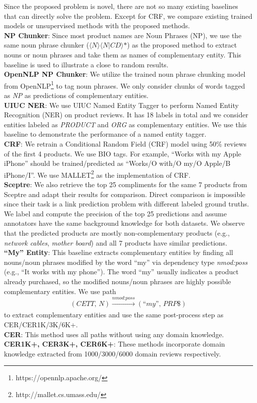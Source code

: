 Since the proposed problem is novel, there are not so many existing baselines that can directly solve the problem. Except for CRF, we compare existing trained models or unsupervised methods with the proposed methods.\\
\textbf{NP Chunker}: Since most product names are Noun Phrases (NP), we use the same noun phrase chunker ($\langle \textit{N} \rangle \langle \textit{N}\vert \textit{CD} \rangle \textit{*}$) as the proposed method to extract nouns or noun phrases and take them as names of complementary entity. This baseline is used to illustrate a close to random results.\\
\textbf{OpenNLP NP Chunker}: We utilize the trained noun phrase chunking model from OpenNLP\footnote{https://opennlp.apache.org/} to tag noun phrases. We only consider chunks of words tagged as \textit{NP} as predictions of complementary entities.\\
\textbf{UIUC NER}: We use UIUC Named Entity Tagger \cite{ratinov2009design} to perform Named Entity Recognition (NER) on product reviews. It has 18 labels in total and we consider entities labeled as \textit{PRODUCT} and \textit{ORG} as complementary entities. We use this baseline to demonstrate the performance of a named entity tagger.\\
\textbf{CRF}: We retrain a Conditional Random Field (CRF) model using 50\% reviews of the first 4 products. We use BIO tags. For example, ``Works with my Apple iPhone'' should be trained/predicted as ``Works/O with/O my/O Apple/B iPhone/I''. We use MALLET\footnote{http://mallet.cs.umass.edu/} as the implementation of CRF.\\
\textbf{Sceptre}: We also retrieve the top 25 compliments for the same 7 products from Sceptre \cite{McAPanLes15} and adapt their results for comparison. Direct comparison is impossible since their task is a link prediction problem with different labeled ground truths. We label and compute the precision of the top 25 predictions and assume annotators have the same background knowledge for both datasets. We observe that the predicted products are mostly non-complementary products (e.g., \textit{network cables}, \textit{mother board}) and all 7 products have similar predictions.\\
\textbf{``My'' Entity}: This baseline extracts complementary entities by finding all nouns/noun phrases modified by the word ``my'' via dependency type \textit{nmod:poss} (e.g., ``It works with my phone''). The word ``my'' usually indicates a product already purchased, so the modified nouns/noun phrases are highly possible complementary entities. We use path
$$(\textit{CETT, N})\xrightarrow[]{\textit{nmod:poss}}(\textit{``my'', PRP\$})$$
to extract complementary entities and use the same post-process step as CER/CER1K/3K/6K+. \\
\textbf{CER}: This method uses all paths without using any domain knowledge.\\
\textbf{CER1K+, CER3K+, CER6K+}: These methods incorporate domain knowledge extracted from 1000/3000/6000 domain reviews respectively.

